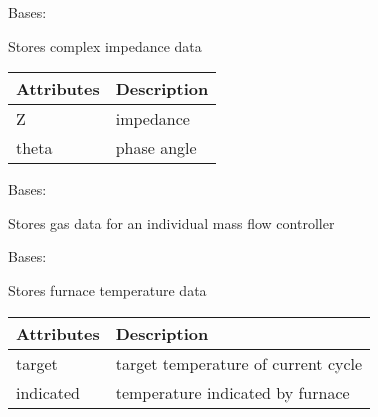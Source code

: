 \documentclass[letterpaper,10pt,english]{sphinxmanual}
\begin{document}
\begin{fulllineitems}
\label{\detokenize{source/laboratory.utils:laboratory.utils.data.Impedance}}
Bases: 

Stores complex impedance data


\begin{savenotes}\sphinxattablestart
\centering
\begin{tabulary}{\linewidth}[t]{|T|T|}
\hline
\sphinxstyletheadfamily 
Attributes
&\sphinxstyletheadfamily 
Description
\\
\hline
Z
&
impedance
\\
\hline
theta
&
phase angle
\\
\hline
\end{tabulary}
\par
\sphinxattableend\end{savenotes}

\end{fulllineitems}


\begin{fulllineitems}
\label{\detokenize{source/laboratory.utils:laboratory.utils.data.MFC_data}}
Bases: 

Stores gas data for an individual mass flow controller

\end{fulllineitems}


\begin{fulllineitems}
\label{\detokenize{source/laboratory.utils:laboratory.utils.data.Temp}}
Bases: 

Stores furnace temperature data


\begin{savenotes}\sphinxattablestart
\centering
\begin{tabulary}{\linewidth}[t]{|T|T|}
\hline
\sphinxstyletheadfamily 
Attributes
&\sphinxstyletheadfamily 
Description
\\
\hline
target
&
target temperature of current cycle
\\
\hline
indicated
&
temperature indicated by furnace
\\
\hline
\end{tabulary}
\par
\sphinxattableend\end{savenotes}

\end{fulllineitems}
\end{document}
